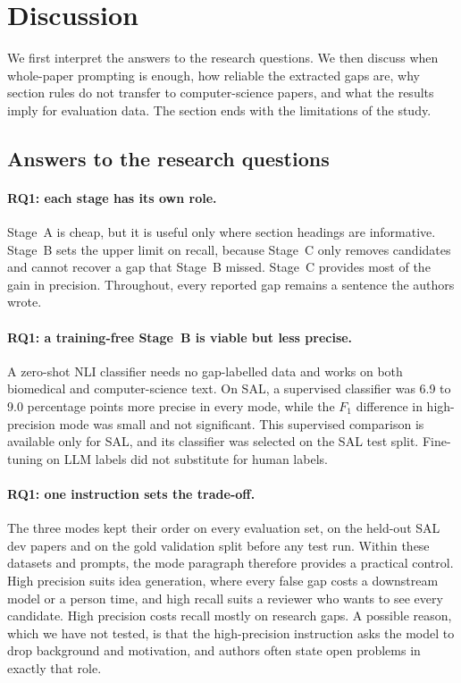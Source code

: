 \section{Discussion}
\label{sec:discussion}

We first interpret the answers to the research questions. We then discuss when whole-paper prompting is enough, how reliable the extracted gaps are, why section rules do not transfer to computer-science papers, and what the results imply for evaluation data. The section ends with the limitations of the study.

\subsection{Answers to the research questions}

\paragraph{RQ1: each stage has its own role.} Stage~A is cheap, but it is useful only where section headings are informative. Stage~B sets the upper limit on recall, because Stage~C only removes candidates and cannot recover a gap that Stage~B missed. Stage~C provides most of the gain in precision. Throughout, every reported gap remains a sentence the authors wrote.

\paragraph{RQ1: a training-free Stage~B is viable but less precise.} A zero-shot NLI classifier needs no gap-labelled data and works on both biomedical and computer-science text. On SAL, a supervised classifier was 6.9 to 9.0 percentage points more precise in every mode, while the $F_1$ difference in high-precision mode was small and not significant. This supervised comparison is available only for SAL, and its classifier was selected on the SAL test split. Fine-tuning on LLM labels did not substitute for human labels.

\paragraph{RQ1: one instruction sets the trade-off.} The three modes kept their order on every evaluation set, on the held-out SAL dev papers and on the gold validation split before any test run. Within these datasets and prompts, the mode paragraph therefore provides a practical control. High precision suits idea generation, where every false gap costs a downstream model or a person time, and high recall suits a reviewer who wants to see every candidate. High precision costs recall mostly on research gaps. A possible reason, which we have not tested, is that the high-precision instruction asks the model to drop background and motivation, and authors often state open problems in exactly that role.

